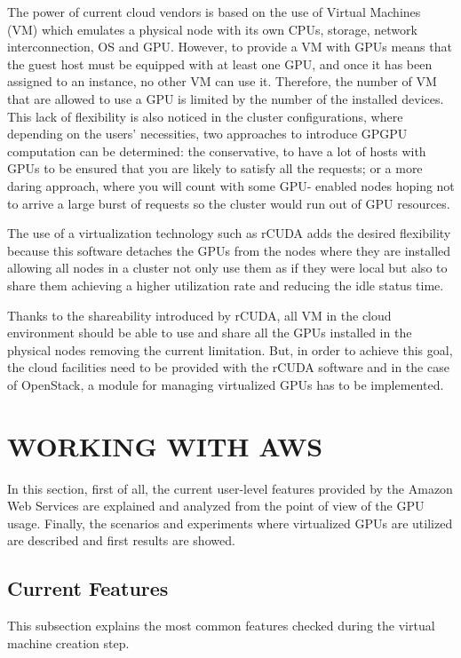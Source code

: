 \documentclass[a4paper,twoside]{article}
\begin{document}
The power of current cloud vendors is based on the use 
of Virtual Machines (VM) which  
emulates a physical node with its own 
CPUs, storage, network interconnection, OS and GPU. 
However, to provide a VM with GPUs means
that the guest host must be equipped with at least one GPU, and
once it has been assigned to an instance, no other VM can use
it. Therefore, the number of VM that are allowed to use a GPU is 
limited by the number of the installed devices. This lack of 
flexibility is also noticed in the cluster configurations, where 
depending on the users’ necessities, 
two approaches to introduce GPGPU computation can be determined:
the conservative, to have a lot of hosts with GPUs to be
ensured that you are likely to satisfy all the requests; or a
more daring approach, where you will count with some GPU-
enabled nodes hoping not to arrive a large burst of requests
so the cluster would run out of GPU resources.

The use of a virtualization technology such as {rCUDA} adds 
the desired flexibility because this software detaches the GPUs 
from the nodes where they are installed allowing all nodes in a cluster
not only use them as if they were local but also to share them 
achieving a higher utilization rate and reducing the idle status time.

Thanks to the shareability introduced by {rCUDA}, all VM in the cloud 
environment should be able to use and share all the GPUs installed in 
the physical nodes removing the current limitation. But, in order to achieve this goal, 
the cloud facilities need to be provided with the {rCUDA} software and 
in the case of OpenStack, a module for managing virtualized GPUs 
 has to be implemented.  



\section{\uppercase{Working with AWS}}
\label{sec:aws}
In this section, first of all, the current user-level features 
provided by the Amazon Web Services are explained and analyzed 
from the point of view of the GPU usage. 
Finally, the scenarios and experiments where virtualized GPUs are utilized are 
described and first results are showed.

\subsection{Current Features}
This subsection explains the most common features checked during 
the virtual machine creation step.
\end{document}
